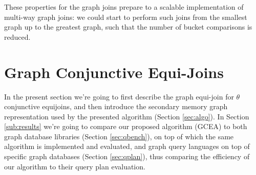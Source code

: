 These properties for the graph joins prepare to a scalable implementation of multi-way graph joins: we could start to perform such joins from the smallest graph up to the greatest graph, such that the number of bucket comparisons is reduced.


\section{Graph Conjunctive Equi-Joins}
In the present section we're going to first describe the graph equi-join for $\theta$ conjunctive equijoins, and then introduce the secondary memory graph representation used by the presented algorithm (Section \ref{sec:algo}). In Section \ref{sub:results} we're going to compare our proposed algorithm (GCEA) to both graph database libraries (Section \vref{sec:qbench}), on top of which the same algorithm is implemented and evaluated, and graph query languages on top of specific graph databases (Section \vref{sec:qplan}), thus comparing the efficiency of our algorithm to their query plan evaluation.

